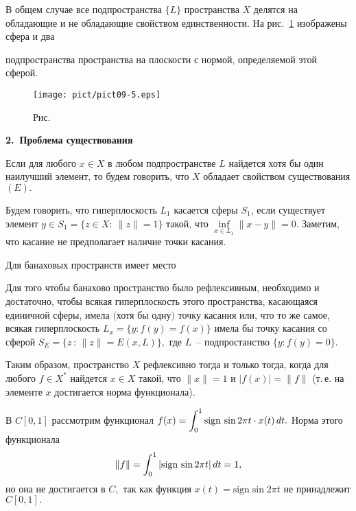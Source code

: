  В общем случае все подпространства $\{L\}$ пространства $X$
 делятся на обладающие и  не обладающие свойством единственности.
 {На {рис.~\ref{r9-5}} изображены сфера и два}
 {подпространства пространства на плоскости с нормой,
 определяемой этой сферой.

 \begin{figure}[ht]
\begin{center}
\texttt{[image: pict/pict09-5.eps]}
\end{center}
 \bigskip
 \label{r9-5}

 \centerline{Рис.~\theris}
 \bigskip
\end{figure}


 \vspace{3mm}
 {\bf 2.~Проблема существования}
  \vspace{3mm}

 Если для  любого $x\in X$ в любом подпространстве $L$
 найдется  хотя бы один наилучший элемент, то будем говорить, что $X$
 обладает свойством существования $(E).$

Будем говорить, что гиперплоскость {$L_1$} касается сферы
$S_1$, если существует элемент $y\in S_1=\{ z\in X:\ \|z\|=1\}$
такой, что $\inf\limits_{x\in {L_1}} \|x-y\|=0.$ Заметим, что касание не предполагает наличие точки касания.

Для банаховых пространств {имеет место}
 \begin{teo}[Джеймс] %
 Для того чтобы банахово пространство было рефлексивным, необходимо и
 достаточно, чтобы всякая гиперплоскость этого пространства,
 касающаяся единичной сферы, имела $($хотя бы одну$)$ точку касания
 {или, что то же самое, всякая гиперплоскость $L_x=\{y : f(y)=f(x)\}$ имела бы точку}
 {касания со сферой $S_E=\{z\,:\,\|z\|=E(x,L)\},$ где $L$~-- подпростанство $\{y:f(y)=0\}.$}
 \end{teo}

 Таким образом, пространство $X$
  рефлексивно тогда и только тогда, когда для любого $f\in X^*$
 найдется $x\in X$ такой, что $\|x\|=1$ и $|f(x)|=\|f\|$
 (т.\,е. на элементе $x$ достигается норма функционала).

 \begin{Example} %
 В $C[0,1]$ рассмотрим функционал $f(x)=\displaystyle\int_0^1 {\rm sign \, }\sin 2\pi t\cdot
 x(t)\,dt.$ Норма этого функционала
 $$
 \|f\|=\int_0^1 |{\rm sign \, }\sin 2\pi t|\, dt=1,
 $$
 но она не достигается в $C,$ так как функция $x(t)=\mbox{sign} \sin
 2\pi t$ не принадлежит $C[0,1].$



\end{Example}}
